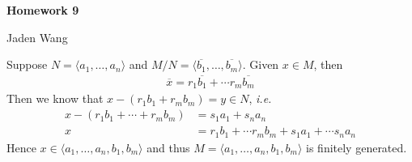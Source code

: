 \documentclass[12pt]{article}
\begin{document}
\centerline {\textsf{\textbf{\LARGE{Homework 9}}}}
\centerline {Jaden Wang}
\vspace{.15in}

\begin{problem}[1]
Suppose $ N = \langle a_1,\ldots,a_n \rangle$ and $ M / N = \langle \overline{b_1}, \ldots, \overline{b_m} \rangle$. Given $ x \in M$, then
\begin{align*}
	\overline{x} = r_1 \overline{b_1} + \cdots r_m \overline{b_m}
\end{align*}
Then we know that $ x - (r_1 b_1 + r_m b_m) = y \in N$, \emph{i.e.}
\begin{align*}
	x - (r_1 b_1 + \cdots + r_m b_m) &= s_1 a_1 + s_n a_n \\
	x &= r_1 b_1 + \cdots r_m b_m + s_1 a_1 + \cdots s_n a_n
\end{align*}
Hence $ x \in \langle a_1,\ldots,a_n,b_1,b_m \rangle$ and thus $ M = \langle a_1,\ldots, a_n, b_1,b_m \rangle$ is finitely generated.
\end{problem}
\end{document}

